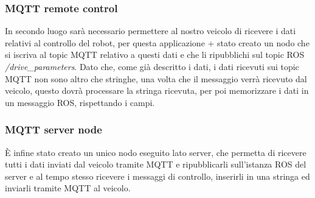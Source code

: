 \subsubsection{MQTT remote control}
In secondo luogo sarà necessario permettere al nostro veicolo di ricevere i dati relativi al controllo del robot, per questa applicazione + stato creato un nodo che si iscriva al topic MQTT relativo a questi dati e che li ripubblichi sul topic ROS \textit{/drive\_parameters}. Dato che, come già descritto i dati, i dati ricevuti sui topic MQTT non sono altro che stringhe, una volta che il messaggio verrà ricevuto dal veicolo, questo dovrà processare la stringa ricevuta, per poi memorizzare i dati in un messaggio ROS, rispettando i campi.

\subsubsection{MQTT server node}
È infine stato creato un unico nodo eseguito lato server, che permetta di ricevere tutti i dati inviati dal veicolo tramite MQTT e ripubblicarli sull'istanza ROS del server e al tempo stesso ricevere i messaggi di controllo, inserirli in una stringa ed inviarli tramite MQTT al veicolo.
